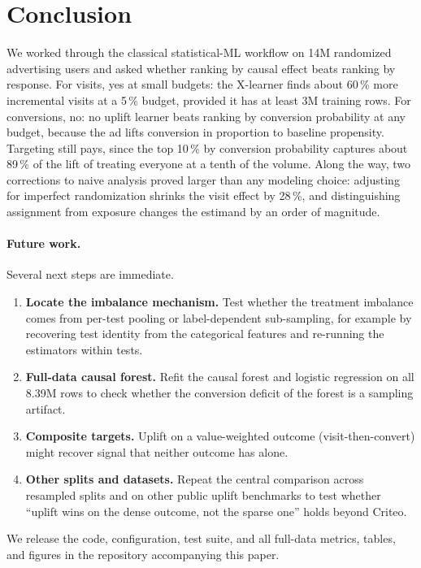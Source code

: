 \section{Conclusion}
\label{sec:conclusion}

We worked through the classical statistical-ML workflow on 14M randomized
advertising users and asked whether ranking by causal effect beats ranking
by response. For visits, yes at small budgets: the X-learner finds about
60\,\% more incremental visits at a 5\,\% budget, provided it has at least 3M
training rows. For conversions, no: no uplift learner beats ranking by
conversion probability at any budget, because the ad lifts conversion in
proportion to baseline propensity. Targeting still pays, since the top 10\,\%
by conversion probability captures about 89\,\% of the lift of treating everyone
at a tenth of the volume. Along the way, two corrections to naive analysis
proved larger than any modeling choice: adjusting for imperfect
randomization shrinks the visit effect by 28\,\%, and distinguishing assignment from
exposure changes the estimand by an order of magnitude.

\paragraph{Future work.} Several next steps are immediate.
\begin{enumerate}
  \item \textbf{Locate the imbalance mechanism.} Test whether the treatment
        imbalance comes from per-test pooling or label-dependent
        sub-sampling, for example by recovering test identity from the
        categorical features and re-running the estimators within tests.
  \item \textbf{Full-data causal forest.} Refit the causal forest and
        logistic regression on all 8.39M rows to check whether the
        conversion deficit of the forest is a sampling artifact.
  \item \textbf{Composite targets.} Uplift on a value-weighted outcome
        (visit-then-convert) might recover signal that neither outcome has
        alone.
  \item \textbf{Other splits and datasets.} Repeat the central comparison
        across resampled splits and on other public uplift benchmarks to test
        whether ``uplift wins on the dense outcome, not the sparse one'' holds
        beyond Criteo.
\end{enumerate}

We release the code, configuration, test suite, and all full-data metrics,
tables, and figures in the repository accompanying this paper.
